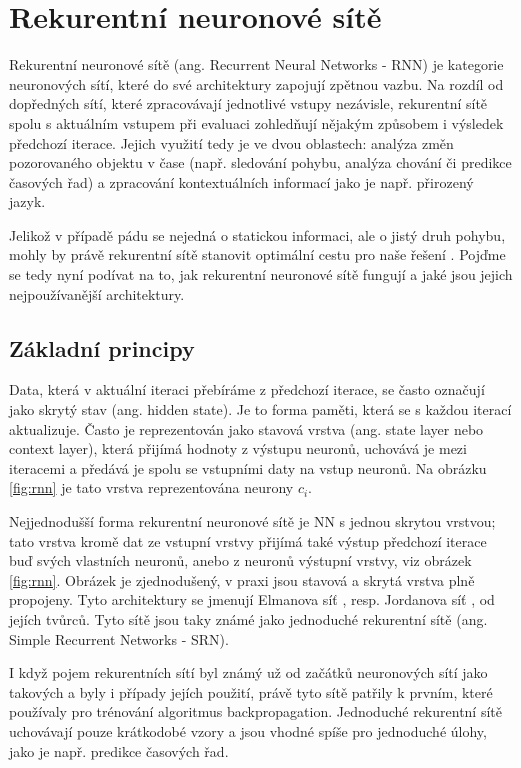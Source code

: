 \chapter{Rekurentní neuronové sítě}
\label{chap:RNN}

Rekurentní neuronové sítě (ang. Recurrent Neural Networks - RNN) je kategorie
neuronových sítí, které do své architektury zapojují zpětnou vazbu. Na rozdíl
od dopředných sítí, které zpracovávají jednotlivé vstupy nezávisle, rekurentní
sítě spolu s aktuálním vstupem při evaluaci zohledňují nějakým způsobem i
výsledek předchozí iterace. Jejich využití tedy je ve dvou oblastech: analýza
změn pozorovaného objektu v čase (např. sledování pohybu, analýza chování či
predikce časových řad) a zpracování kontextuálních informací jako je např.
přirozený jazyk.

Jelikož v případě pádu se nejedná o statickou informaci, ale o jistý druh
pohybu, mohly by právě rekurentní sítě stanovit optimální cestu pro naše řešení
\cite{dhruv2020image}. Pojďme se tedy nyní podívat na to, jak rekurentní
neuronové sítě fungují a jaké jsou jejich nejpoužívanější architektury.

\section{Základní principy}

Data, která v aktuální iteraci přebíráme z předchozí iterace, se často označují
jako skrytý stav (ang. hidden state). Je to forma paměti, která se s každou
iterací aktualizuje. Často je reprezentován jako stavová vrstva (ang. state
layer nebo context layer), která přijímá hodnoty z výstupu neuronů, uchovává je
mezi iteracemi a předává je spolu se vstupními daty na vstup neuronů. Na
obrázku \ref{fig:rnn} je tato vrstva reprezentována neurony $c_i$.

Nejjednodušší forma rekurentní neuronové sítě je NN s jednou skrytou vrstvou;
tato vrstva kromě dat ze vstupní vrstvy přijímá také výstup předchozí iterace
buď svých vlastních neuronů, anebo z neuronů výstupní vrstvy, viz obrázek
\ref{fig:rnn}. Obrázek je zjednodušený, v praxi jsou stavová a skrytá vrstva
plně propojeny. Tyto architektury se jmenují Elmanova síť \cite{elman}, resp.
Jordanova síť \cite{jordan}, od jejích tvůrců. Tyto sítě jsou taky známé jako
jednoduché rekurentní sítě (ang. Simple Recurrent Networks - SRN).

I když pojem rekurentních sítí byl známý už od začátků neuronových sítí jako
takových a byly i případy jejích použití, právě tyto sítě patřily k prvním,
které používaly pro trénování algoritmus backpropagation. Jednoduché rekurentní
sítě uchovávají pouze krátkodobé vzory a jsou vhodné spíše pro jednoduché
úlohy, jako je např. predikce časových řad.

